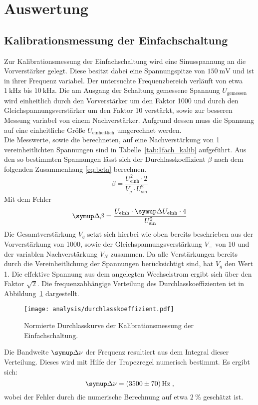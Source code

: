 \section{Auswertung}
\label{sec:auswertung}
%

%
\subsection{Kalibrationsmessung der Einfachschaltung}
%
Zur Kalibrationsmessung der Einfachschaltung wird eine Sinusspannung an die
Vorverstärker gelegt. Diese besitzt dabei eine Spannungspitze von
$\SI{150}{\milli\volt}$ und ist in ihrer Frequenz variabel. Der untersuchte
Frequenzbereich verläuft von etwa $\SI{1}{\kilo\hertz}$ bis
$\SI{10}{\kilo\hertz}$. Die am Ausgang der Schaltung gemessene Spannung
$U_\text{gemessen}$ wird einheitlich durch den Vorverstärker um den Faktor
\num{1000} und durch den Gleichspannungsverstärker um den Faktor \num{10}
verstärkt, sowie zur besseren Messung variabel von einem Nachverstärker.
Aufgrund dessen muss die Spannung auf eine einheitliche Größe $U_\text{einheitlich}$
umgerechnet werden.\\
%
Die Messwerte, sowie die berechneten, auf eine Nachverstärkung von \num{1}
vereinheitlichten Spannungen sind in Tabelle~\ref{tab:1fach_kalib} aufgeführt.
Aus den so bestimmten Spannungen lässt sich der Durchlasskoeffizient $\beta$
nach dem folgenden Zusammenhang \eqref{eq:beta} berechnen.
%
\begin{equation}
  \beta= \frac{U_\text{einh}^2 \cdot 2}{V_g \cdot U_\text{sin}^2}
  \label{eq:beta}
\end{equation}
%
Mit dem Fehler
%
\begin{equation}
  \upD\beta=\frac{U_\text{einh}\cdot\upD U_\text{einh}\cdot 4}{U^2_\text{sin}}
\end{equation}
%
Die Gesamtverstärkung $V_g$ setzt sich hierbei wie oben bereits beschrieben aus
der Vorverstärkung von \num{1000}, sowie der Gleichspannungsverstärkung $V_{=}$ von
\num{10} und der variablen Nachverstärkung $V_N$ zusammen. Da alle Verstärkungen bereits
durch die Vereinheitlichung der Spannungen berücksichtigt sind, hat $V_g$ den Wert
\num{1}. Die effektive Spannung aus dem angelegten Wechselstrom ergibt sich über den Faktor $\sqrt{2}$.
Die frequenzabhängige Verteilung des Durchlasskoeffizienten ist in
Abbildung~\ref{fig:beta} dargestellt.
%
\begin{figure}
  \centering
  \texttt{[image: analysis/durchlasskoeffizient.pdf]}
  \caption{Normierte Durchlasskurve der Kalibrationsmessung der Einfachschaltung.}
  \label{fig:beta}
\end{figure}
%
Die Bandweite $\upD\nu$ der Frequenz resultiert aus dem Integral dieser
Verteilung. Dieses wird mit Hilfe der Trapezregel numerisch bestimmt. Es ergibt
sich:
%
\begin{equation}
  \upD\nu=\SI{3500(70)}{\hertz}\; ,
\end{equation}
%
wobei der Fehler durch die numerische Berechnung auf etwa $\SI{2}{\percent}$ geschätzt ist.

